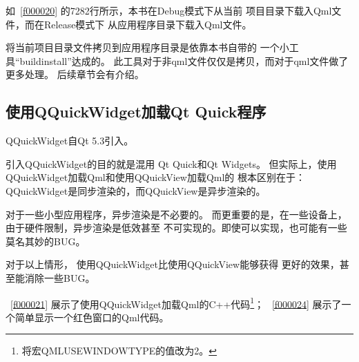 如\lstlistingname\ \ref{f000020}
的72\raisebox{0.16ex}{\sourcefonttwo\~{}}82行所示，本书在Debug模式下从当前
项目目录下载入Qml文件，而在Release模式下
从应用程序目录下载入Qml文件。

将当前项目目录文件拷贝到应用程序目录是依靠本书自带的
一个小工具“build\underline{\hspace{0.5em}}install”达成的。
此工具对于非qml文件仅仅是拷贝，而对于qml文件做了更多处理。
后续章节会有介绍。

\FloatBarrier
\subsection{
使用QQuickWidget加载Qt Quick程序
}\label{ss001110}


QQuickWidget自Qt 5.3引入。

引入QQuickWidget的目的就是混用
Qt Quick和Qt Widgets。
但实际上，使用QQuickWidget加载Qml和使用QQuickView加载Qml的
根本区别在于：
QQuickWidget是同步渲染的，而QQuickView是异步渲染的。

对于一些小型应用程序，异步渲染是不必要的。
而更重要的是，在一些设备上，由于硬件限制，异步渲染是低效甚至
不可实现的。即使可以实现，也可能有一些莫名其妙的BUG。

对于以上情形，
使用QQuickWidget比使用QQuickView能够获得
更好的效果，甚至能消除一些BUG。

\lstlistingname\ \ref{f000021}
展示了使用QQuickWidget加载Qml的C{\sourcefonttwo{}+}{\sourcefonttwo{}+}代码\footnote{
将宏QML\underline{\hspace{0.5em}}USE\underline{\hspace{0.5em}}WINDOW\underline{\hspace{0.5em}}TYPE的值改为2。
}；
\lstlistingname\ \ref{f000024}
展示了一个简单显示一个红色窗口的Qml代码。

